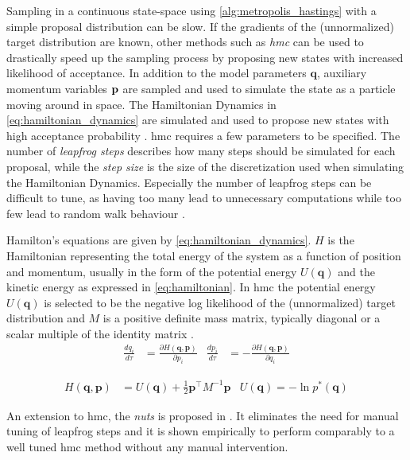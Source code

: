 Sampling in a continuous state-space using \cref{alg:metropolis_hastings} with a simple proposal distribution can be slow. If the gradients of the (unnormalized) target distribution are known, other methods such as \textit{\acrfull{hmc}} can be used to drastically speed up the sampling process by proposing new states with increased likelihood of acceptance. In addition to the model parameters $\mathbf{q}$, auxiliary momentum variables $\bf p$ are sampled and used to simulate the state as a particle moving around in space. The Hamiltonian Dynamics in \cref{eq:hamiltonian_dynamics} are simulated and used to propose new states with high acceptance probability \cite{neal2012mcmc,murphy,hoffman2011nouturn,robert2018accelerating}. \acrshort{hmc} requires a few parameters to be specified. The number of \textit{leapfrog steps} describes how many steps should be simulated for each proposal, while the \textit{step size} is the size of the discretization used when simulating the Hamiltonian Dynamics. Especially the number of leapfrog steps can be difficult to tune, as having too many lead to unnecessary computations while too few lead to random walk behaviour \cite{hoffman2011nouturn}. 

Hamilton's equations are given by \cref{eq:hamiltonian_dynamics}. $H$ is the Hamiltonian representing the total energy of the system as a function of position and momentum, usually in the form of the potential energy $U(\mathbf{q})$ and the kinetic energy as expressed in \cref{eq:hamiltonian}. In \acrshort{hmc} the potential energy $U(\mathbf{q})$ is selected to be the negative log likelihood of the (unnormalized) target distribution and $M$ is a positive definite mass matrix, typically diagonal or a scalar multiple of the identity matrix \cite{neal2012mcmc}. 
\begin{align}\label{eq:hamiltonian_dynamics}
    \frac{d q_i}{d\tau} &= \frac{\partial H(\mathbf{q}, \mathbf{p})}{\partial p_i} & \frac{d p_i}{d\tau} &= -\frac{\partial H(\mathbf{q}, \mathbf{p})}{\partial q_i}
\end{align}

\begin{align}\label{eq:hamiltonian}
    H(\mathbf{q}, \mathbf{p}) &= U(\mathbf{q}) + \frac{1}{2} \mathbf{p}^\intercal M^{-1} \mathbf{p} & U(\mathbf{q}) = - \ln p^*(\mathbf{q})
\end{align}

An extension to \acrshort{hmc}, the \textit{\acrfull{nuts}} is proposed in \cite{hoffman2011nouturn}. It eliminates the need for manual tuning of leapfrog steps and it is shown empirically to perform comparably to a well tuned \acrshort{hmc} method without any manual intervention.



